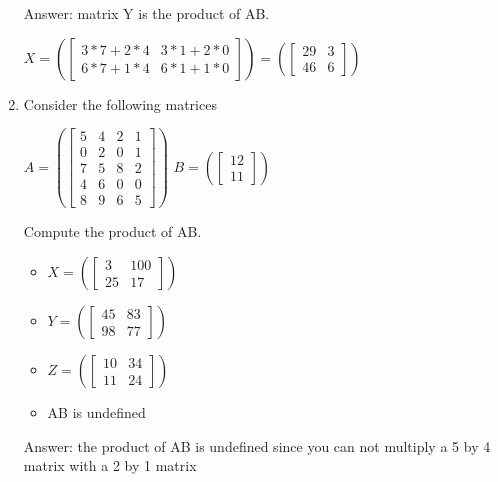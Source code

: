 \documentclass{article}
\begin{document}
\begin{enumerate}
        Answer: matrix Y is the product of AB. 
        
        $X = \left( \begin{bmatrix} 3*7 + 2*4& 3*1 + 2*0\\ 6*7 + 1*4&6*1 + 1*0 \end{bmatrix} \right)
        = \left( \begin{bmatrix} 29&3\\ 46&6 \end{bmatrix} \right)$ 
     
    \item Consider the following matrices
     
        $A = \left( \begin{bmatrix} 5 & 4& 2 & 1 \\ 0 & 2& 0 & 1\\ 7 & 5& 8 & 2\\ 4 & 6& 0 & 0\\ 8 & 9& 6 & 5 \end{bmatrix} \right)$ 
        $B = \left( \begin{bmatrix} 12\\ 11 \end{bmatrix} \right)$
        
        Compute the product of AB.
        
        \begin{itemize}
            \item $X = \left( \begin{bmatrix} 3&100\\ 25&17 \end{bmatrix} \right)$
            \item  $Y = \left( \begin{bmatrix} 45&83\\ 98&77 \end{bmatrix} \right)$
            \item  $Z = \left( \begin{bmatrix} 10&34\\ 11&24 \end{bmatrix} \right)$
            \item  AB is undefined    
        \end{itemize}        
        
        Answer: the product of AB is undefined since you can not multiply a 5 by 4 matrix with a 2 by 1 matrix
        
\end{enumerate}
\end{document}
